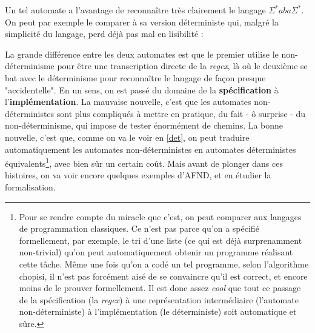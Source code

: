 Un tel automate a l'avantage de reconnaître très clairement le langage $\Sigma^*aba\Sigma^*$. On peut par exemple le comparer à sa version déterministe qui, malgré la simplicité du langage, perd déjà pas mal en lisibilité :

\begin{figure}[!ht]
\centering
{}
\end{figure}

La grande différence entre les deux automates est que le premier utilise le non-déterminisme pour être une transcription directe de la \textit{regex}, là où le deuxième se bat avec le déterminisme pour reconnaître le langage de façon presque "accidentelle". En un sens, on est passé du domaine de la \textbf{spécification} à l'\textbf{implémentation}. La mauvaise nouvelle, c'est que les automates non-déterministes sont plus compliqués à mettre en pratique, du fait - ô surprise - du non-déterminisme, qui impose de tester énormément de chemins. La bonne nouvelle, c'est que, comme on va le voir en \ref{det}, on peut traduire automatiquement les automates non-déterministes en automates déterministes équivalents\footnote{Pour se rendre compte du miracle que c'est, on peut comparer aux langages de programmation classiques. Ce n'est pas parce qu'on a spécifié formellement, par exemple, le tri d'une liste (ce qui est déjà surprenamment non-trivial) qu'on peut automatiquement obtenir un programme réalisant cette tâche. Même une fois qu'on a codé un tel programme, selon l'algorithme chopisi, il n'est pas forcément aisé de se convaincre qu'il est correct, et encore moins de le prouver formellement. Il est donc assez \textit{cool} que tout ce passage de la spécification (la \textit{regex}) à une représentation intermédiaire (l'automate non-déterministe) à l'implémentation (le déterministe) soit automatique et sûre.}, avec bien sûr un certain coût. Mais avant de plonger dans ces histoires, on va voir encore quelques exemples d'AFND, et en étudier la formalisation.

